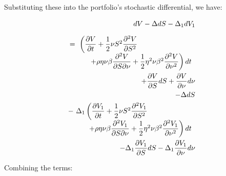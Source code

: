 \documentclass[uplatex,a4j,12pt,dvipdfmx]{jsarticle}
\begin{document}
Substituting these into the portfolio's stochastic differential, we have:

\begin{eqnarray*}
	&&
	dV - \Delta dS - \Delta_{1} dV_{1}
	\\[2mm]
	&&
	\hspace{-10mm}
	\begin{array}{l}
		= \
		\left(
		\dfrac{\partial V}{\partial t}
		+
		\dfrac{1}{2}
		\nu S^{2}
		\dfrac{\partial^{2} V}{\partial S^{2}}
		\right.
		\\ \hspace{10mm}
		\left.
		+
		\rho \eta \nu \beta
		\dfrac{\partial^{2} V}{\partial S \partial \nu}
		+
		\dfrac{1}{2}
		\eta^{2} \nu \beta^{2}
		\dfrac{\partial^{2} V}{\partial \nu^{2}}
		\right)dt
	\end{array}
	\\
	&&
	\hspace{-5mm}
	+
	\dfrac{\partial V}{\partial S}
	dS
	+
	\dfrac{\partial V}{\partial \nu}
	d\nu
	\\
	&&
	\hspace{-5mm}
	-
	\Delta dS
	\\
	&&
	\hspace{-6.6mm}
	\begin{array}{l}
		- \
		\Delta_{1}
		\left(
		\dfrac{\partial V_{1}}{\partial t}
		+
		\dfrac{1}{2}
		\nu S^{2}
		\dfrac{\partial^{2} V_{1}}{\partial S^{2}}
		\right.
		\\ \hspace{10mm}
		\left.
		+
		\rho \eta \nu \beta
		\dfrac{\partial^{2} V_{1}}{\partial S \partial \nu}
		+
		\dfrac{1}{2}
		\eta^{2} \nu \beta^{2}
		\dfrac{\partial^{2} V_{1}}{\partial \nu^{2}}
		\right)dt
	\end{array}
	\\
	&&
	\hspace{-5mm}
	-
	\Delta_{1}
	\dfrac{\partial V_{1}}{\partial S}
	dS
	-
	\Delta_{1}
	\dfrac{\partial V_{1}}{\partial \nu}
	d\nu
\end{eqnarray*}

Combining the terms:
\end{document}
